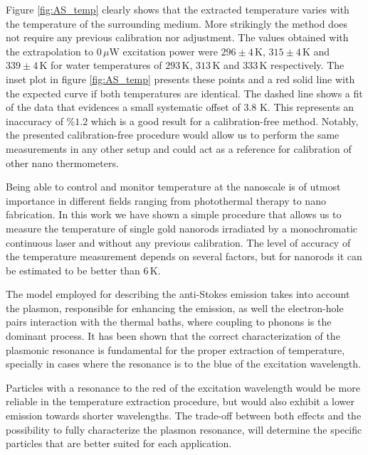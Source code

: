\documentclass[journal=nalefd,manuscript=letter]{achemso}
\newcommand{\K}{\ensuremath{\,\textrm{K}}}
\newcommand{\uW}{\ensuremath{\,\mu\textrm{W}}}
\begin{document}
Figure \ref{fig:AS_temp} clearly shows that the extracted temperature varies
with the temperature of the surrounding medium. More strikingly the method does
not require any previous calibration nor adjustment. The values obtained with
the extrapolation to $0\uW$ excitation power were $296 \pm 4\K$, $315\pm 4\K$
and $339 \pm 4\K$ for water temperatures of $293\K$, $313\K$ and $333\K$
respectively. The inset plot in figure \ref{fig:AS_temp} presents these points 
and a red solid line with the expected curve if both temperatures are identical. The 
dashed line shows a fit of the data that evidences a small systematic offset of $3.8\,\K$. This represents
an inaccuracy of $\%1.2$ which is a good result for a calibration-free method.
Notably, the presented calibration-free procedure would allow us to perform the same
measurements in any other setup and could act as a reference for calibration of
other nano thermometers.


Being able to control and monitor temperature at the nanoscale is of utmost
importance in different fields ranging from photothermal therapy\cite{Huang2006}
to nano fabrication\cite{Fedoruk2013}. In this work we have shown a simple
procedure that allows us to measure the temperature of single gold nanorods
irradiated by a monochromatic continuous laser and without any previous
calibration. The level of accuracy of the temperature measurement depends on
several factors, but for nanorods it can be estimated to be better than $6\K$.

The model employed for describing the anti-Stokes emission takes into account
the plasmon, responsible for enhancing the emission, as well the electron-hole pairs
interaction with the thermal baths, where coupling to phonons is the dominant process.
It has been shown that the correct characterization of the plasmonic resonance is
fundamental for the proper extraction of temperature, specially in cases
where the resonance is to the blue of the excitation wavelength.

Particles with a resonance to the red of the excitation wavelength would be more
reliable in the temperature extraction procedure, but would also exhibit a lower
emission towards shorter wavelengths. The trade-off between both effects and
the possibility to fully characterize the plasmon resonance, will determine the
specific particles that are better suited for each application.
\end{document}
